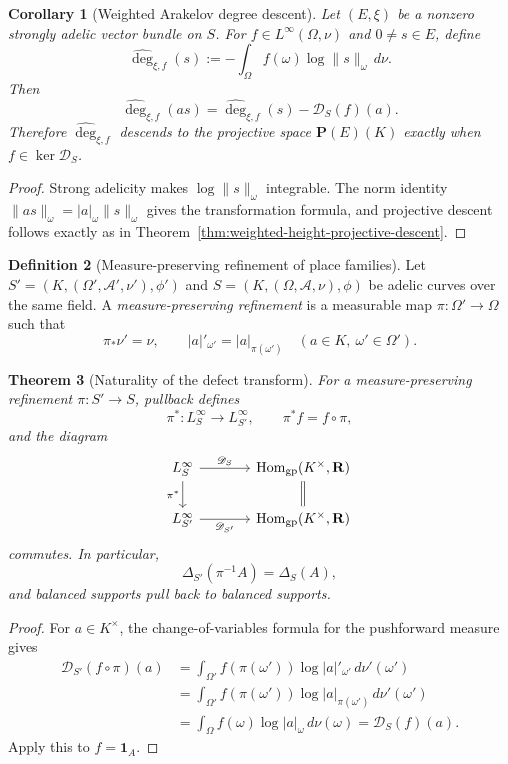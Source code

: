 \documentclass[11pt]{amsart}
\numberwithin{equation}{section}
\newtheorem{theorem}{Theorem}[section]
\newtheorem{corollary}[theorem]{Corollary}
\theoremstyle{definition}
\newtheorem{definition}[theorem]{Definition}
\newcommand{\R}{\mathbf R}
\newcommand{\Hom}{\operatorname{Hom}}
\begin{document}
\begin{corollary}[Weighted Arakelov degree descent]
\label{cor:weighted-degree-descent}
Let $(E,\xi)$ be a nonzero strongly adelic vector bundle on $S$.  For
$f\in L^\infty(\Omega,\nu)$ and $0\neq s\in E$, define
\[
\widehat{\deg}_{\xi,f}(s)
:=-\int_\Omega f(\omega)\log\|s\|_\omega\,d\nu.
\]
Then
\[
\widehat{\deg}_{\xi,f}(as)
=\widehat{\deg}_{\xi,f}(s)-\mathscr D_S(f)(a).
\]
Therefore $\widehat{\deg}_{\xi,f}$ descends to the projective space
$\mathbf P(E)(K)$ exactly when $f\in\ker\mathscr D_S$.
\end{corollary}

\begin{proof}
Strong adelicity makes $\log\|s\|_\omega$ integrable.  The norm identity
$\|as\|_\omega=|a|_\omega\|s\|_\omega$ gives the transformation formula,
and projective descent follows exactly as in
Theorem~\ref{thm:weighted-height-projective-descent}.
\end{proof}

\begin{definition}[Measure-preserving refinement of place families]
\label{def:adelic-place-refinement}
Let $S'=(K,(\Omega',\mathcal A',\nu'),\phi')$ and
$S=(K,(\Omega,\mathcal A,\nu),\phi)$ be adelic curves over the same field.
A \emph{measure-preserving refinement} is a measurable map
$\pi:\Omega'\to\Omega$ such that
\[
\pi_*\nu'=\nu,
\qquad
|a|'_{\omega'}=|a|_{\pi(\omega')}
\quad(a\in K,\ \omega'\in\Omega').
\]
\end{definition}

\begin{theorem}[Naturality of the defect transform]
\label{thm:adelic-defect-naturality}
For a measure-preserving refinement $\pi:S'\to S$, pullback defines
\[
\pi^*:L^\infty_S\longrightarrow L^\infty_{S'},
\qquad
\pi^*f=f\circ\pi,
\]
and the diagram
\[
\begin{tikzcd}[column sep=large]
L^\infty_S \arrow[r,"\mathscr D_S"] \arrow[d,"\pi^*"']
& \Hom_{\mathrm{gp}}(K^\times,\R) \arrow[d,equal]\\
L^\infty_{S'} \arrow[r,"\mathscr D_{S'}"']
& \Hom_{\mathrm{gp}}(K^\times,\R)
\end{tikzcd}
\]
commutes.  In particular,
\[
\Delta_{S'}(\pi^{-1}A)=\Delta_S(A),
\]
and balanced supports pull back to balanced supports.
\end{theorem}

\begin{proof}
For $a\in K^\times$, the change-of-variables formula for the pushforward
measure gives
\[
\begin{aligned}
\mathscr D_{S'}(f\circ\pi)(a)
&=\int_{\Omega'}f(\pi(\omega'))
   \log|a|'_{\omega'}\,d\nu'(\omega')\\
&=\int_{\Omega'}f(\pi(\omega'))
   \log|a|_{\pi(\omega')}\,d\nu'(\omega')\\
&=\int_\Omega f(\omega)\log|a|_\omega\,d\nu(\omega)
 =\mathscr D_S(f)(a).
\end{aligned}
\]
Apply this to $f=\mathbf1_A$.
\end{proof}
\end{document}
